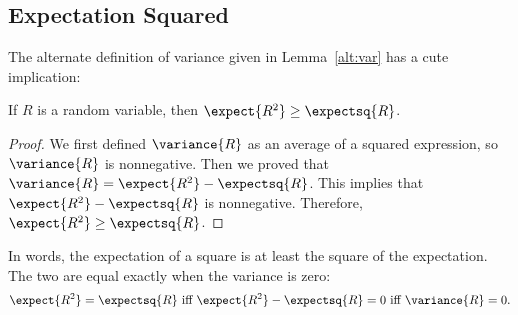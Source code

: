 \begin{editingnotes}

\subsection{Expectation Squared}

The alternate definition of variance given in Lemma~\ref{alt:var} has
a cute implication:
\begin{corollary}
If $R$ is a random variable, then $\expect{R^2} \geq \expectsq{R}$.
\end{corollary}
\begin{proof}
We first defined $\variance{R}$ as an average of a squared expression, so
$\variance{R}$ is nonnegative.  Then we proved that $\variance{R} =
\expect{R^2} - \expectsq{R}$.  This implies that $\expect{R^2} -
\expectsq{R}$ is nonnegative.  Therefore, $\expect{R^2} \geq
\expectsq{R}$.
\end{proof}

In words, the expectation of a square is at least the square of the
expectation. The two are equal exactly when the variance is zero:
\begin{displaymath}
\expect{R^2} = \expectsq{R} \text{  iff  } \expect{R^2} - \expectsq{R} = 0
\text{  iff  } \variance{R} = 0.
\end{displaymath}

\end{editingnotes}

